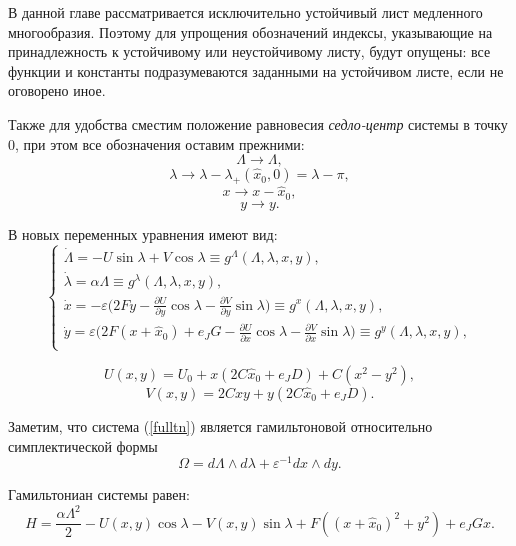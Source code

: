 В данной главе рассматривается исключительно устойчивый лист медленного многообразия. Поэтому для упрощения обозначений индексы, указывающие на принадлежность к устойчивому или неустойчивому листу, будут опущены: все функции и константы подразумеваются заданными на устойчивом листе, если не оговорено иное.

Также для удобства сместим положение равновесия \textit{седло-центр} системы в точку $0$, при этом все обозначения оставим прежними:
$$\Lambda \rightarrow \Lambda,$$
$$\lambda \rightarrow \lambda - \lambda_+(\hat x_0,0) = \lambda - \pi,$$
$$x \rightarrow x - \hat x_0,$$
$$y \rightarrow y.$$

В новых переменных уравнения имеют вид:
\begin{equation}
    \begin{cases}
        \dot \Lambda = - U \sin \lambda + V \cos \lambda \equiv g^\Lambda(\Lambda,\lambda,x,y), \\
        \dot \lambda = \alpha \Lambda \equiv g^\lambda(\Lambda,\lambda,x,y), \\
        \dot x = -\varepsilon \big( 2Fy-\frac{\partial U}{\partial y} \cos \lambda - \frac{\partial V}{\partial y} \sin \lambda \big) \equiv g^x(\Lambda,\lambda,x,y), \\
        \dot y = \varepsilon \big( 2F(x+\hat x_0)+e_JG -\frac{\partial U}{\partial x} \cos \lambda - \frac{\partial V}{\partial x} \sin \lambda \big) \equiv g^y(\Lambda,\lambda,x,y), \\
    \end{cases}
    \label{fulltn}
\end{equation}

$$U(x,y) = U_0 + x(2C \hat x_0+e_JD)+C(x^2-y^2),$$
$$V(x,y) = 2Cxy+y(2C \hat x_0+e_JD).$$

Заметим, что система (\ref{fulltn}) является гамильтоновой относительно симплектической формы
$$\Omega = d \Lambda \wedge d \lambda + \varepsilon^{-1} dx \wedge dy.$$

Гамильтониан системы равен:
\begin{equation}
H = \frac{\alpha \Lambda^2}{2} - U(x,y)\cos{\lambda} - V(x,y)\sin{\lambda} + F \left((x+\hat x_0)^2+y^2 \right) + e_J G x. 
\label{H}
\end{equation}
